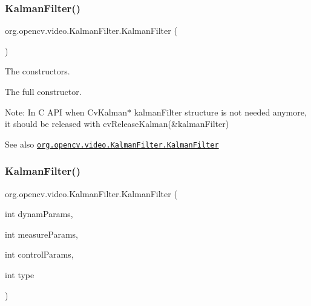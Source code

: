\mbox{\label{classorg_1_1opencv_1_1video_1_1_kalman_filter_a49a321fdcc081e6f68aceb24b8397111}} 
\subsubsection{\texorpdfstring{Kalman\+Filter()}{KalmanFilter()}\hspace{0.1cm}{\footnotesize\ttfamily [2/4]}}
{\footnotesize\ttfamily org.\+opencv.\+video.\+Kalman\+Filter.\+Kalman\+Filter (\begin{DoxyParamCaption}{ }\end{DoxyParamCaption})}

The constructors.

The full constructor.

Note\+: In C A\+PI when {\ttfamily Cv\+Kalman$\ast$ kalman\+Filter} structure is not needed anymore, it should be released with {\ttfamily cv\+Release\+Kalman(\&kalman\+Filter)}

\begin{DoxySeeAlso}{See also}
\href{http://docs.opencv.org/modules/video/doc/motion_analysis_and_object_tracking.html#kalmanfilter-kalmanfilter}{\tt org.\+opencv.\+video.\+Kalman\+Filter.\+Kalman\+Filter} 
\end{DoxySeeAlso}
\mbox{\label{classorg_1_1opencv_1_1video_1_1_kalman_filter_a924d7dd0b8d06dd45b8987425a28b365}} 
\subsubsection{\texorpdfstring{Kalman\+Filter()}{KalmanFilter()}\hspace{0.1cm}{\footnotesize\ttfamily [3/4]}}
{\footnotesize\ttfamily org.\+opencv.\+video.\+Kalman\+Filter.\+Kalman\+Filter (\begin{DoxyParamCaption}\item[{int}]{dynam\+Params,  }\item[{int}]{measure\+Params,  }\item[{int}]{control\+Params,  }\item[{int}]{type }\end{DoxyParamCaption})}

